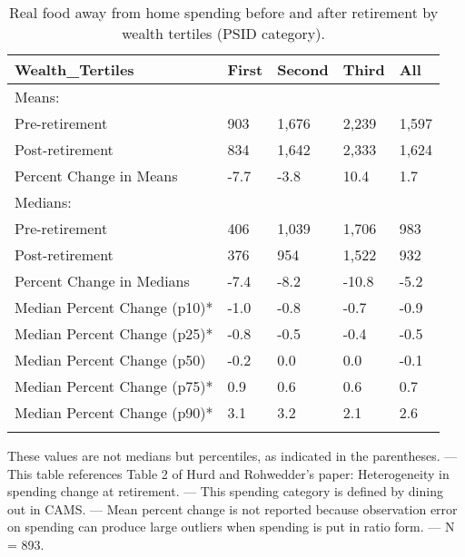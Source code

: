 \begin{table}[tbp] \centering
{}

\caption{Real food away from home spending before and after retirement by wealth tertiles (PSID category).}
\begin{tabularx}{\textwidth}{lCCCC}

\toprule
{Wealth\_Tertiles}&{First}&{Second}&{Third}&{All} \tabularnewline
\midrule\addlinespace[1.5ex]
Means:&&&& \tabularnewline
\midrule Pre-retirement&903&1,676&2,239&1,597 \tabularnewline
Post-retirement&834&1,642&2,333&1,624 \tabularnewline
Percent Change in Means&-7.7&-3.8&10.4&1.7 \tabularnewline
\midrule Medians:&&&& \tabularnewline
\midrule Pre-retirement&406&1,039&1,706&983 \tabularnewline
Post-retirement&376&954&1,522&932 \tabularnewline
Percent Change in Medians&-7.4&-8.2&-10.8&-5.2 \tabularnewline
Median Percent Change (p10)*&-1.0&-0.8&-0.7&-0.9 \tabularnewline
Median Percent Change (p25)*&-0.8&-0.5&-0.4&-0.5 \tabularnewline
Median Percent Change (p50)&-0.2&0.0&0.0&-0.1 \tabularnewline
Median Percent Change (p75)*&0.9&0.6&0.6&0.7 \tabularnewline
Median Percent Change (p90)*&3.1&3.2&2.1&2.6 \tabularnewline
\bottomrule \addlinespace[1.5ex]

\end{tabularx}
\begin{flushleft}
\footnotesize *These values are not medians but percentiles, as indicated in the parentheses. \linebreak --- \linebreak This table references Table 2 of Hurd and Rohwedder's paper: Heterogeneity in spending change at retirement. \linebreak --- \linebreak This spending category is defined by dining out in CAMS. \linebreak --- \linebreak Mean percent change is not reported because observation error on spending can produce large outliers when spending is put in ratio form. \linebreak --- \linebreak N = 893.
\end{flushleft}
\end{table}
